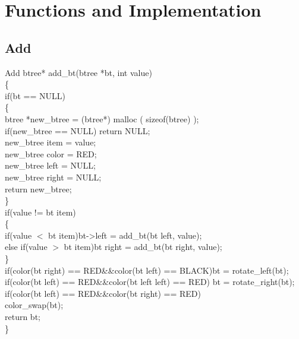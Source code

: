 \documentclass{beamer}
\begin{document}
\section{Functions and Implementation}
\subsection{Add}
\begin{frame}{Add}
\tiny{btree* add\_bt(btree *bt, int value)\\
\{\\
    if(bt == NULL)\\
    \{\\
        btree *new\_btree = (btree*) malloc ( sizeof(btree) );\\
        if(new\_btree == NULL) return NULL;\\
        new\_btree \rightarrow item = value;\\
        new\_btree \rightarrow color = RED;\\
        new\_btree \rightarrow left = NULL;\\
        new\_btree \rightarrow right = NULL;\\
        return new\_btree;\\
    \}\\
    if(value != bt \rightarrow item)\\
    \{\\
        if(value $<$ bt \rightarrow item)\quad bt->left = add\_bt(bt \rightarrow left, value);\\
        else if(value $>$ bt \rightarrow item)\quad bt \rightarrow right = add\_bt(bt \rightarrow right, value);\\
    \}\\
    if(color(bt \rightarrow right) == RED\quad \&\&\quad color(bt \rightarrow left) == BLACK)\quad bt = rotate\_left(bt);\\
    if(color(bt \rightarrow left) == RED\quad \&\&\quad color(bt \rightarrow left \rightarrow left) == RED) \quad bt = rotate\_right(bt);\\
    if(color(bt \rightarrow left) == RED\quad \&\&\quad color(bt \rightarrow right) == RED)\\ color\_swap(bt);\\
    return bt;\\
\}}
\end{frame}
\end{document}
